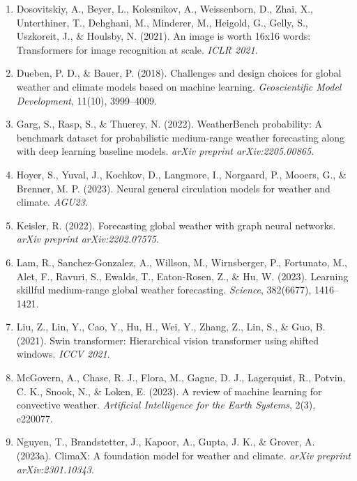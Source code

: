 \documentclass[12pt,a4paper,oneside]{report}
\begin{document}
\begin{enumerate}
    \item Dosovitskiy, A., Beyer, L., Kolesnikov, A., Weissenborn, D., Zhai, X., Unterthiner, T., Dehghani, M., Minderer, M., Heigold, G., Gelly, S., Uszkoreit, J., \& Houlsby, N. (2021). An image is worth 16x16 words: Transformers for image recognition at scale. \textit{ICLR 2021}.

    \item Dueben, P. D., \& Bauer, P. (2018). Challenges and design choices for global weather and climate models based on machine learning. \textit{Geoscientific Model Development}, 11(10), 3999--4009.

    \item Garg, S., Rasp, S., \& Thuerey, N. (2022). WeatherBench probability: A benchmark dataset for probabilistic medium-range weather forecasting along with deep learning baseline models. \textit{arXiv preprint arXiv:2205.00865}.

    \item Hoyer, S., Yuval, J., Kochkov, D., Langmore, I., Norgaard, P., Mooers, G., \& Brenner, M. P. (2023). Neural general circulation models for weather and climate. \textit{AGU23}.

    \item Keisler, R. (2022). Forecasting global weather with graph neural networks. \textit{arXiv preprint arXiv:2202.07575}.

    \item Lam, R., Sanchez-Gonzalez, A., Willson, M., Wirnsberger, P., Fortunato, M., Alet, F., Ravuri, S., Ewalds, T., Eaton-Rosen, Z., \& Hu, W. (2023). Learning skillful medium-range global weather forecasting. \textit{Science}, 382(6677), 1416--1421.

    \item Liu, Z., Lin, Y., Cao, Y., Hu, H., Wei, Y., Zhang, Z., Lin, S., \& Guo, B. (2021). Swin transformer: Hierarchical vision transformer using shifted windows. \textit{ICCV 2021}.

    \item McGovern, A., Chase, R. J., Flora, M., Gagne, D. J., Lagerquist, R., Potvin, C. K., Snook, N., \& Loken, E. (2023). A review of machine learning for convective weather. \textit{Artificial Intelligence for the Earth Systems}, 2(3), e220077.

    \item Nguyen, T., Brandstetter, J., Kapoor, A., Gupta, J. K., \& Grover, A. (2023a). ClimaX: A foundation model for weather and climate. \textit{arXiv preprint arXiv:2301.10343}.


\end{enumerate}
\end{document}
